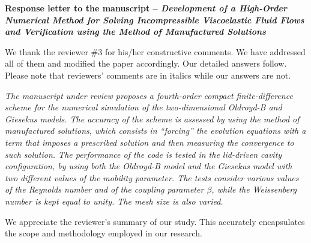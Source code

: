 \documentclass[12pt]{article}
\begin{document}
{\large \textbf{Response letter to the manuscript
-- \emph{Development of a High-Order Numerical Method for Solving Incompressible Viscoelastic Fluid Flows and Verification using the Method of Manufactured Solutions}}}

\vspace{0.8cm}
We thank the reviewer \#3 for his/her constructive comments. We have addressed all of them and modified the paper accordingly. Our detailed answers follow. Please note that reviewers' comments are in italics while our answers are not.
\vspace{0.8cm}

{\it The manuscript under review proposes a fourth-order compact finite-difference scheme for the numerical simulation of the two-dimensional Oldroyd-B and Giesekus models. The accuracy of the scheme is assessed by using the method of manufactured solutions, which consists in “forcing” the evolution equations with a term that imposes a prescribed solution and then measuring the convergence to such solution. The performance of the code is tested in the lid-driven cavity configuration, by using both the Oldroyd-B model and the Giesekus model with two different values of the mobility parameter. The tests consider various values of the Reynolds number and of the coupling parameter $\beta$, while the Weissenberg number is kept equal to unity. The mesh size is also varied.}

\vspace{3mm}
We appreciate the reviewer's summary of our study. This accurately encapsulates the scope and methodology employed in our research.
\vspace{3mm}
\end{document}
